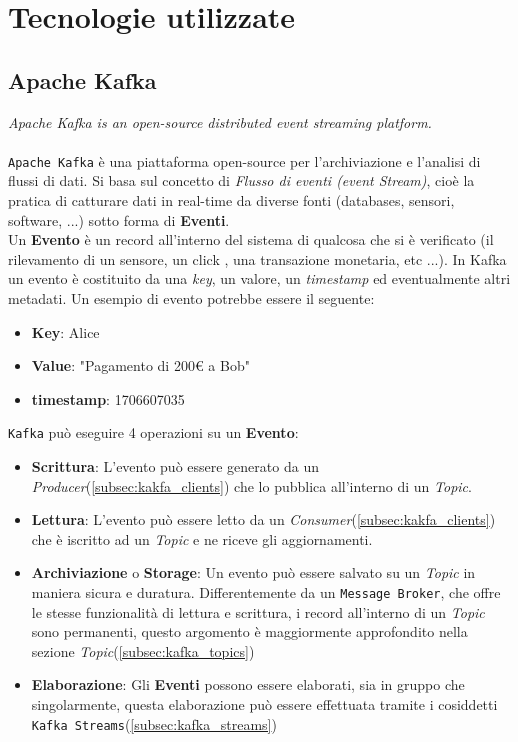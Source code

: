 \chapter{Tecnologie utilizzate}
\label{ch:Tecnologies}

\section{Apache Kafka}
\label{ch:kafka_overview}
\textit{Apache Kafka is an open-source distributed event streaming platform.}\cite{kafkawebsite}\\\\
\texttt{Apache Kafka} è una piattaforma open-source per l'archiviazione e l'analisi di flussi di dati.
Si basa sul concetto di \textit{Flusso di eventi (event Stream)}, cioè la pratica di catturare dati in real-time da diverse fonti (databases, sensori, software, ...) sotto forma di \textbf{Eventi}.\\
Un \textbf{Evento} è un record all'interno del sistema di qualcosa che si è verificato (il rilevamento di un sensore, un click , una transazione monetaria, etc ...). In Kafka un evento è costituito da una \textit{key}, un valore, un \textit{timestamp} ed eventualmente altri metadati. Un esempio di evento potrebbe essere il seguente:
\begin{itemize}
    \item \textbf{Key}: Alice
    \item \textbf{Value}: "Pagamento di 200\euro{} a Bob"
    \item \textbf{timestamp}: 1706607035
\end{itemize}
\texttt{Kafka} può eseguire 4 operazioni su un \textbf{Evento}:
\begin{itemize}
    \item \textbf{Scrittura}: L'evento può essere generato da un \textit{Producer}(\ref{subsec:kakfa_clients}) che lo pubblica all'interno di un \textit{Topic}.
    \item \textbf{Lettura}: L'evento può essere letto da un \textit{Consumer}(\ref{subsec:kakfa_clients}) che è iscritto ad un \textit{Topic} e ne riceve gli aggiornamenti.
    \item \textbf{Archiviazione} o \textbf{Storage}: Un evento può essere salvato su un \textit{Topic} in maniera sicura e duratura. Differentemente da un \texttt{Message Broker}, che offre le stesse funzionalità di lettura e scrittura, i record all'interno di un \textit{Topic} sono permanenti, questo argomento è maggiormente approfondito nella sezione \textit{Topic}(\ref{subsec:kafka_topics})
    \item \textbf{Elaborazione}: Gli \textbf{Eventi} possono essere elaborati, sia in gruppo che singolarmente, questa elaborazione può essere effettuata tramite i cosiddetti \texttt{Kafka Streams}(\ref{subsec:kafka_streams})
\end{itemize}
